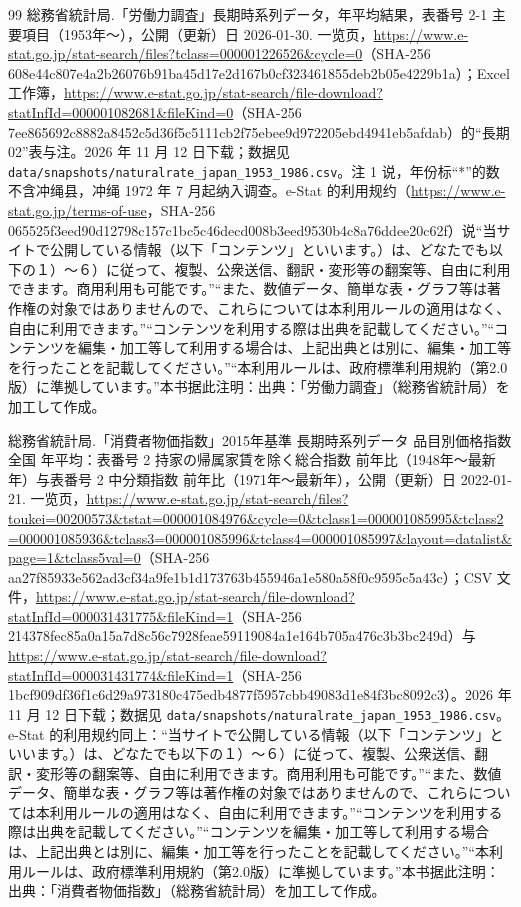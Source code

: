 \begin{thebibliography}{99}
 総務省統計局.「労働力調査」長期時系列データ，年平均結果，表番号 2-1 主要項目（1953年～），公開（更新）日 2026-01-30. 一览页，\url{https://www.e-stat.go.jp/stat-search/files?tclass=000001226526&cycle=0}（SHA-256 608e44c807e4a2b26076b91ba45d17e2d167b0cf323461855deb2b05e4229b1a）；Excel 工作簿，\url{https://www.e-stat.go.jp/stat-search/file-download?statInfId=000001082681&fileKind=0}（SHA-256 7ee865692c8882a8452c5d36f5c5111cb2f75ebee9d972205ebd4941eb5afdab）的“長期02”表与注。2026 年 11 月 12 日下载；数据见 \texttt{data/snapshots/naturalrate\_japan\_1953\_1986.csv}。注 1 说，年份标“*”的数不含冲绳县，冲绳 1972 年 7 月起纳入调查。e-Stat 的利用规约（\url{https://www.e-stat.go.jp/terms-of-use}，SHA-256 065525f3eed90d12798c157c1bc5c46decd008b3eed9530b4c8a76ddee20c62f）说“当サイトで公開している情報（以下「コンテンツ」といいます。）は、どなたでも以下の１）～６）に従って、複製、公衆送信、翻訳・変形等の翻案等、自由に利用できます。商用利用も可能です。”“また、数値データ、簡単な表・グラフ等は著作権の対象ではありませんので、これらについては本利用ルールの適用はなく、自由に利用できます。”“コンテンツを利用する際は出典を記載してください。”“コンテンツを編集・加工等して利用する場合は、上記出典とは別に、編集・加工等を行ったことを記載してください。”“本利用ルールは、政府標準利用規約（第2.0版）に準拠しています。”本书据此注明：出典：「労働力調査」（総務省統計局）を加工して作成。

 総務省統計局.「消費者物価指数」2015年基準 長期時系列データ 品目別価格指数 全国 年平均：表番号 2 持家の帰属家賃を除く総合指数 前年比（1948年～最新年）与表番号 2 中分類指数 前年比（1971年～最新年），公開（更新）日 2022-01-21. 一览页，\url{https://www.e-stat.go.jp/stat-search/files?toukei=00200573&tstat=000001084976&cycle=0&tclass1=000001085995&tclass2=000001085936&tclass3=000001085996&tclass4=000001085997&layout=datalist&page=1&tclass5val=0}（SHA-256 aa27f85933e562ad3cf34a9fe1b1d173763b455946a1e580a58f0c9595c5a43c）；CSV 文件，\url{https://www.e-stat.go.jp/stat-search/file-download?statInfId=000031431775&fileKind=1}（SHA-256 214378fec85a0a15a7d8c56c7928feae59119084a1e164b705a476c3b3bc249d）与 \url{https://www.e-stat.go.jp/stat-search/file-download?statInfId=000031431774&fileKind=1}（SHA-256 1bcf909df36f1c6d29a973180c475edb4877f5957cbb49083d1e84f3bc8092c3）。2026 年 11 月 12 日下载；数据见 \texttt{data/snapshots/naturalrate\_japan\_1953\_1986.csv}。e-Stat 的利用规约同上：“当サイトで公開している情報（以下「コンテンツ」といいます。）は、どなたでも以下の１）～６）に従って、複製、公衆送信、翻訳・変形等の翻案等、自由に利用できます。商用利用も可能です。”“また、数値データ、簡単な表・グラフ等は著作権の対象ではありませんので、これらについては本利用ルールの適用はなく、自由に利用できます。”“コンテンツを利用する際は出典を記載してください。”“コンテンツを編集・加工等して利用する場合は、上記出典とは別に、編集・加工等を行ったことを記載してください。”“本利用ルールは、政府標準利用規約（第2.0版）に準拠しています。”本书据此注明：出典：「消費者物価指数」（総務省統計局）を加工して作成。


\end{thebibliography}
